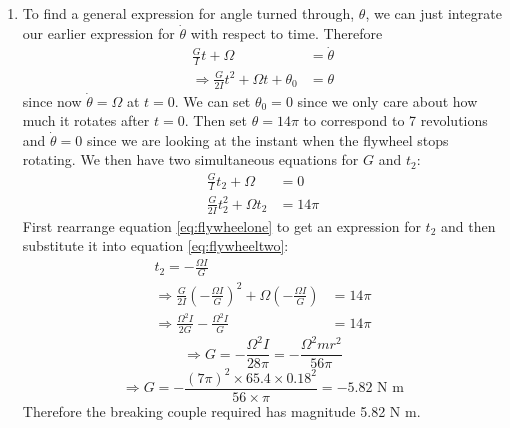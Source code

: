 \begin{hint}
{\begin{enumerate}
\begin{align*}
\frac{G}{I}t_1+\omega&=\Omega \\
\Rightarrow t_1&=\frac{I}{G}\left(\Omega-\omega\right)
\end{align*}
Notice how leaving everything in symbols until the very end makes checking your work for mistakes much easier and also avoids rounding errors. To find the numerical answer we need to use $I\s{disc}=\frac{1}{2}mr^2$ and the earlier expression for $G$, to give:
\begin{align*}
t_1=\frac{mr^2}{2r(T_2-T_1)}\left(\Omega-\omega\right) \\
\Rightarrow	t\s{1} = \frac{65.4 \times 0.18^{2}}{2\times 0.18\left(500 - 20\right)}\left(7\pi - 2\pi\right) \\
\Rightarrow	t\s{1} = 0.193 \textrm{ s}
\end{align*}
\item To find a general expression for angle turned through, $\theta$, we can just integrate our earlier expression for $\dot\theta$ with respect to time. Therefore
\begin{align*}
\frac{G}{I}t+\Omega&=\dot\theta \\
\Rightarrow \frac{G}{2I}t^2+\Omega t+\theta_0&=\theta
\end{align*}
since now $\dot\theta=\Omega$ at $t=0$. We can set $\theta_0=0$ since we only care about how much it rotates after $t=0$. Then set $\theta=14\pi$ to correspond to 7 revolutions and $\dot\theta=0$ since we are looking at the instant when the flywheel stops rotating. We then have two simultaneous equations for $G$ and $t_2$:
\begin{align}
\frac{G}{I}t_2+\Omega&=0 \label{eq:flywheelone} \\
\frac{G}{2I}t_2^2+\Omega t_2&=14\pi \label{eq:flywheeltwo}
\end{align}
First rearrange equation \eqref{eq:flywheelone} to get an expression for $t_2$ and then substitute it into equation \eqref{eq:flywheeltwo}:
\begin{align*}
t_2=-\frac{\Omega I}{G}& \\
\Rightarrow \frac{G}{2I}\left(-\frac{\Omega I}{G}\right)^2+\Omega \left(-\frac{\Omega I}{G}\right)&=14\pi \\
\Rightarrow \frac{\Omega^2I}{2G}-\frac{\Omega^2I}{G}&=14\pi
\end{align*}
\begin{equation*}	\Rightarrow G =-\frac{\Omega^2I}{28\pi} = -\frac{\Omega^2mr^2}{56\pi} 	\end{equation*}
\begin{equation*}	\Rightarrow G = -\frac{\left(7\pi\right)^2\times 65.4 \times 0.18^2}{56\times\pi} = -5.82\textrm{ N m}	\end{equation*}
Therefore the breaking couple required has magnitude 5.82 N m.
\end{enumerate}
}
\end{hint}
